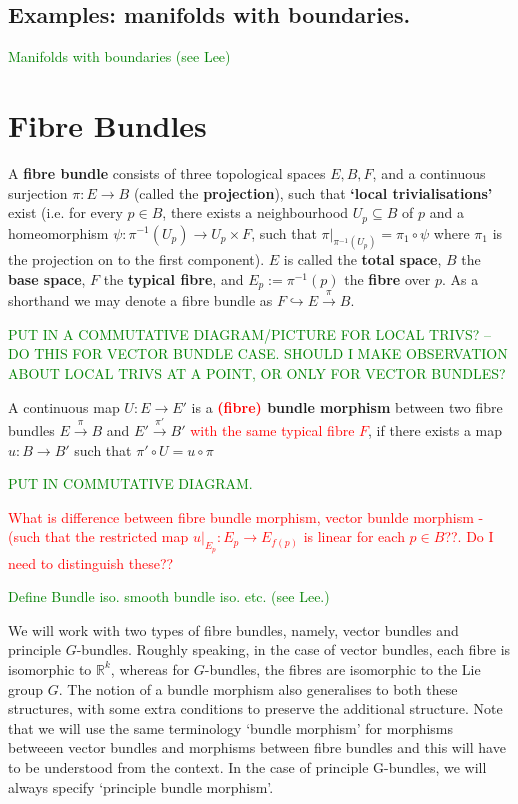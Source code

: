 \documentclass[a4paper]{article}
\theoremstyle{definition} \newtheorem*{definition}{Definition}
\theoremstyle{definition} \newtheorem*{definitions}{Definitions}
\theoremstyle{plain} \newtheorem{theorem}{Theorem}[section]
\theoremstyle{plain} \newtheorem{proposition}[theorem]{Proposition}
\theoremstyle{plain} \newtheorem{corollary}[theorem]{Corollary}
\theoremstyle{plain} \newtheorem{lemma}[theorem]{Lemma}
\theoremstyle{plain} \newtheorem{example}[theorem]{Example}
\newcommand{\checkCorrect}[1]{\textcolor{red}{#1}}
\newcommand{\finish}[1]{\textcolor{green}{#1}}
\newcommand{\defn}[1]{\textbf{#1}}
\newcommand{\realnos}{\mathbb{R}}
\begin{document}
\subsection{Examples: manifolds with boundaries.}
\finish{Manifolds with boundaries (see Lee)}

\section{Fibre Bundles}

A \defn{fibre bundle} consists of three topological spaces $E, B, F$, and a continuous surjection $\pi:E\rightarrow B$ (called the \defn{projection}), such that \defn{`local trivialisations'} exist (i.e. for every $p\in B$, there exists a neighbourhood $U_p\subseteq B$ of $p$ and a homeomorphism $\psi: \pi^{-1}(U_p) \rightarrow U_p \times F$, such that $\pi \vert_{\pi^{-1}(U_p)} = \pi_1 \circ \psi$ where $\pi_1$ is the projection on to the first component). $E$ is called the \defn{total space}, $B$ the \defn{base space}, $F$ the \defn{typical fibre}, and $E_p:=\pi^{-1}(p)$ the \defn{fibre} over $p$. As a shorthand we may denote a fibre bundle as $F\hookrightarrow E\xrightarrow{\pi} B$.

\finish{PUT IN A COMMUTATIVE DIAGRAM/PICTURE FOR LOCAL TRIVS? -- DO THIS FOR VECTOR BUNDLE CASE. SHOULD I MAKE OBSERVATION ABOUT LOCAL TRIVS AT A POINT, OR ONLY FOR VECTOR BUNDLES?}

A continuous map $U:E\rightarrow E'$ is a \defn{\checkCorrect{(fibre)} bundle morphism} between two fibre bundles $E\xrightarrow{\pi} B$ and $E'\xrightarrow{\pi'} B'$ \checkCorrect{with the same typical fibre $F$}, if there exists a map $u:B\rightarrow B'$ such that $\pi' \circ U = u \circ \pi$

\finish{PUT IN COMMUTATIVE DIAGRAM.}

\checkCorrect{What is difference between fibre bundle morphism, vector bunlde morphism - (such that the restricted map $u\vert_{E_p}: E_p \rightarrow E_{f(p)}$ is linear for each $p\in B$??. Do I need to distinguish these??}

\finish{Define Bundle iso. smooth bundle iso. etc. (see Lee.)}

We will work with two types of fibre bundles, namely, vector bundles and principle $G$-bundles. Roughly speaking, in the case of vector bundles, each fibre is isomorphic to $\realnos^k$, whereas for $G$-bundles, the fibres are isomorphic to the Lie group $G$. The notion of a bundle morphism also generalises to both these structures, with some extra conditions to preserve the additional structure. Note that we will use the same terminology `bundle morphism' for morphisms betweeen vector bundles and morphisms between fibre bundles and this will have to be understood from the context. In the case of principle G-bundles, we will always specify `principle bundle morphism'.
\end{document}
